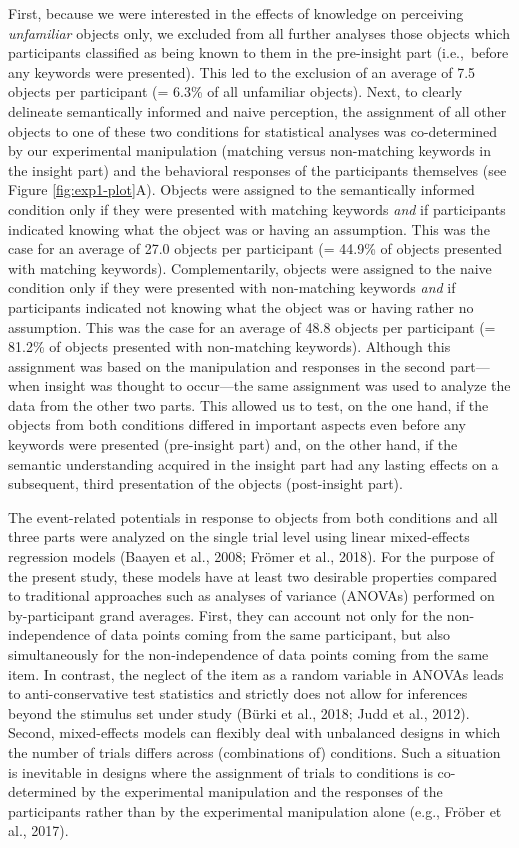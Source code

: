 \documentclass[
  english,
  man,floatsintext]{apa7}
\begin{document}
First, because we were interested in the effects of knowledge on perceiving \emph{unfamiliar} objects only, we excluded from all further analyses those objects which participants classified as being known to them in the pre-insight part (i.e.,~before any keywords were presented). This led to the exclusion of an average of 7.5 objects per participant (= 6.3\% of all unfamiliar objects). Next, to clearly delineate semantically informed and naive perception, the assignment of all other objects to one of these two conditions for statistical analyses was co-determined by our experimental manipulation (matching versus non-matching keywords in the insight part) and the behavioral responses of the participants themselves (see Figure \ref{fig:exp1-plot}A). Objects were assigned to the semantically informed condition only if they were presented with matching keywords \emph{and} if participants indicated knowing what the object was or having an assumption. This was the case for an average of 27.0 objects per participant (= 44.9\% of objects presented with matching keywords). Complementarily, objects were assigned to the naive condition only if they were presented with non-matching keywords \emph{and} if participants indicated not knowing what the object was or having rather no assumption. This was the case for an average of 48.8 objects per participant (= 81.2\% of objects presented with non-matching keywords). Although this assignment was based on the manipulation and responses in the second part---when insight was thought to occur---the same assignment was used to analyze the data from the other two parts. This allowed us to test, on the one hand, if the objects from both conditions differed in important aspects even before any keywords were presented (pre-insight part) and, on the other hand, if the semantic understanding acquired in the insight part had any lasting effects on a subsequent, third presentation of the objects (post-insight part).

The event-related potentials in response to objects from both conditions and all three parts were analyzed on the single trial level using linear mixed-effects regression models (Baayen et al., 2008; Frömer et al., 2018). For the purpose of the present study, these models have at least two desirable properties compared to traditional approaches such as analyses of variance (ANOVAs) performed on by-participant grand averages. First, they can account not only for the non-independence of data points coming from the same participant, but also simultaneously for the non-independence of data points coming from the same item. In contrast, the neglect of the item as a random variable in ANOVAs leads to anti-conservative test statistics and strictly does not allow for inferences beyond the stimulus set under study (Bürki et al., 2018; Judd et al., 2012). Second, mixed-effects models can flexibly deal with unbalanced designs in which the number of trials differs across (combinations of) conditions. Such a situation is inevitable in designs where the assignment of trials to conditions is co-determined by the experimental manipulation and the responses of the participants rather than by the experimental manipulation alone (e.g., Fröber et al., 2017).
\end{document}
